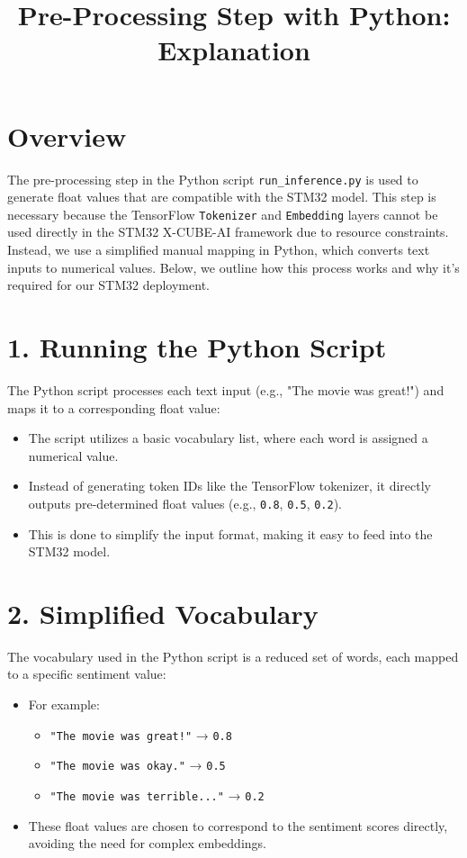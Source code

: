 \documentclass{article}
\title{Pre-Processing Step with Python: Explanation}
\begin{document}
\maketitle

\section*{Overview}

The pre-processing step in the Python script \texttt{run\_inference.py} is used to generate float values that are compatible with the STM32 model. This step is necessary because the TensorFlow \texttt{Tokenizer} and \texttt{Embedding} layers cannot be used directly in the STM32 X-CUBE-AI framework due to resource constraints. Instead, we use a simplified manual mapping in Python, which converts text inputs to numerical values. Below, we outline how this process works and why it’s required for our STM32 deployment.

\section*{1. Running the Python Script}
The Python script processes each text input (e.g., "The movie was great!") and maps it to a corresponding float value:
\begin{itemize}
    \item The script utilizes a basic vocabulary list, where each word is assigned a numerical value.
    \item Instead of generating token IDs like the TensorFlow tokenizer, it directly outputs pre-determined float values (e.g., \texttt{0.8}, \texttt{0.5}, \texttt{0.2}).
    \item This is done to simplify the input format, making it easy to feed into the STM32 model.
\end{itemize}

\section*{2. Simplified Vocabulary}
The vocabulary used in the Python script is a reduced set of words, each mapped to a specific sentiment value:
\begin{itemize}
    \item For example:
    \begin{itemize}
        \item \texttt{"The movie was great!"} → \texttt{0.8}
        \item \texttt{"The movie was okay."} → \texttt{0.5}
        \item \texttt{"The movie was terrible..."} → \texttt{0.2}
    \end{itemize}
    \item These float values are chosen to correspond to the sentiment scores directly, avoiding the need for complex embeddings.
\end{itemize}
\end{document}

